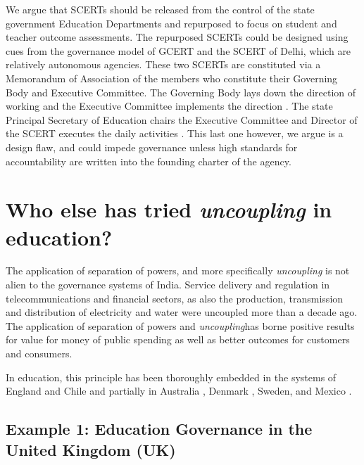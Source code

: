 \documentclass[a4paper, 12pt, twoside]{article}
\begin{document}
We argue that SCERTs should be released from the control of the state government Education Departments and repurposed to focus on student and teacher outcome assessments. The repurposed SCERTs could be designed using cues from the governance model of GCERT and the SCERT of Delhi, which are relatively autonomous agencies. These two SCERTs are constituted via a Memorandum of Association of the members who constitute their Governing Body and Executive Committee. The Governing Body lays down the direction of working and the Executive Committee implements the direction \parencite{del_scert}. The state Principal Secretary of Education chairs the Executive Committee and Director of the SCERT executes the daily activities \parencite{guj_scert_annualreport}. This last one however, we argue is a design flaw, and could impede governance unless high standards for accountability are written into the founding charter of the agency. 


\section*{Who else has tried \textit{uncoupling} in education?} 

The application of separation of powers, and more specifically \textit{uncoupling}  is not alien to the governance systems of India. Service delivery and regulation in telecommunications and financial sectors, as also the production, transmission and distribution of electricity and water were uncoupled more than a decade ago. The application of separation of powers and \textit{uncoupling}has borne positive results for value for money of public spending as well as better outcomes for customers and consumers. 

In education, this principle has been thoroughly embedded in the systems of England and Chile and partially in Australia \parencite{aus_governance}, Denmark \parencite{denmarkgovernance}, Sweden\parencite{sweden_governance}, and Mexico \parencite{mex_governance}. 

\subsection*{Example 1: Education Governance in the United Kingdom (UK)}
\end{document}
